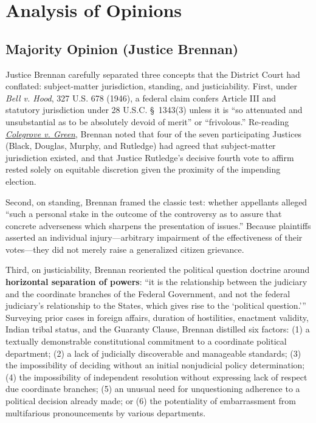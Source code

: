\documentclass[12pt]{article}
\begin{document}
\section{Analysis of Opinions}

\subsection{Majority Opinion (Justice Brennan)}

Justice Brennan carefully separated three concepts that the District Court had conflated: subject-matter jurisdiction, standing, and justiciability. First, under \textit{Bell v. Hood}, 327 U.S. 678 (1946), a federal claim confers Article III and statutory jurisdiction under 28 U.S.C. \S~1343(3) unless it is ``so attenuated and unsubstantial as to be absolutely devoid of merit'' or ``frivolous.'' Re-reading \href{https://supreme.justia.com/cases/federal/us/328/549/}{\textit{Colegrove v. Green}}, Brennan noted that four of the seven participating Justices (Black, Douglas, Murphy, and Rutledge) had agreed that subject-matter jurisdiction existed, and that Justice Rutledge's decisive fourth vote to affirm rested solely on equitable discretion given the proximity of the impending election.

Second, on standing, Brennan framed the classic test: whether appellants alleged ``such a personal stake in the outcome of the controversy as to assure that concrete adverseness which sharpens the presentation of issues.'' Because plaintiffs asserted an individual injury---arbitrary impairment of the effectiveness of their votes---they did not merely raise a generalized citizen grievance.

Third, on justiciability, Brennan reoriented the political question doctrine around \textbf{horizontal separation of powers}: ``it is the relationship between the judiciary and the coordinate branches of the Federal Government, and not the federal judiciary's relationship to the States, which gives rise to the `political question.''' Surveying prior cases in foreign affairs, duration of hostilities, enactment validity, Indian tribal status, and the Guaranty Clause, Brennan distilled six factors: (1) a textually demonstrable constitutional commitment to a coordinate political department; (2) a lack of judicially discoverable and manageable standards; (3) the impossibility of deciding without an initial nonjudicial policy determination; (4) the impossibility of independent resolution without expressing lack of respect due coordinate branches; (5) an unusual need for unquestioning adherence to a political decision already made; or (6) the potentiality of embarrassment from multifarious pronouncements by various departments.
\end{document}
